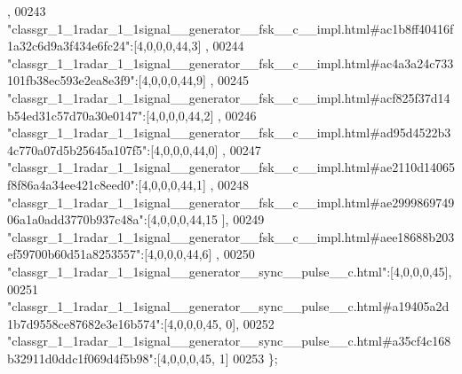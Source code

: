 \begin{DoxyCode}
      ,
00243 \textcolor{stringliteral}{"classgr\_1\_1radar\_1\_1signal\_\_generator\_\_fsk\_\_c\_\_impl.html#ac1b8ff40416f1a32c6d9a3f434e6fc24"}:[4,0,0,0,44,3]
      ,
00244 \textcolor{stringliteral}{"classgr\_1\_1radar\_1\_1signal\_\_generator\_\_fsk\_\_c\_\_impl.html#ac4a3a24c733101fb38ec593e2ea8e3f9"}:[4,0,0,0,44,9]
      ,
00245 \textcolor{stringliteral}{"classgr\_1\_1radar\_1\_1signal\_\_generator\_\_fsk\_\_c\_\_impl.html#acf825f37d14b54ed31c57d70a30e0147"}:[4,0,0,0,44,2]
      ,
00246 \textcolor{stringliteral}{"classgr\_1\_1radar\_1\_1signal\_\_generator\_\_fsk\_\_c\_\_impl.html#ad95d4522b34c770a07d5b25645a107f5"}:[4,0,0,0,44,0]
      ,
00247 \textcolor{stringliteral}{"classgr\_1\_1radar\_1\_1signal\_\_generator\_\_fsk\_\_c\_\_impl.html#ae2110d14065f8f86a4a34ee421c8eed0"}:[4,0,0,0,44,1]
      ,
00248 \textcolor{stringliteral}{"classgr\_1\_1radar\_1\_1signal\_\_generator\_\_fsk\_\_c\_\_impl.html#ae299986974906a1a0add3770b937c48a"}:[4,0,0,0,44,15
      ],
00249 \textcolor{stringliteral}{"classgr\_1\_1radar\_1\_1signal\_\_generator\_\_fsk\_\_c\_\_impl.html#aee18688b203ef59700b60d51a8253557"}:[4,0,0,0,44,6]
      ,
00250 \textcolor{stringliteral}{"classgr\_1\_1radar\_1\_1signal\_\_generator\_\_sync\_\_pulse\_\_c.html"}:[4,0,0,0,45],
00251 \textcolor{stringliteral}{"classgr\_1\_1radar\_1\_1signal\_\_generator\_\_sync\_\_pulse\_\_c.html#a19405a2d1b7d9558ce87682e3e16b574"}:[4,0,0,0,45,
      0],
00252 \textcolor{stringliteral}{"classgr\_1\_1radar\_1\_1signal\_\_generator\_\_sync\_\_pulse\_\_c.html#a35cf4c168b32911d0ddc1f069d4f5b98"}:[4,0,0,0,45,
      1]
00253 \};
\end{DoxyCode}
